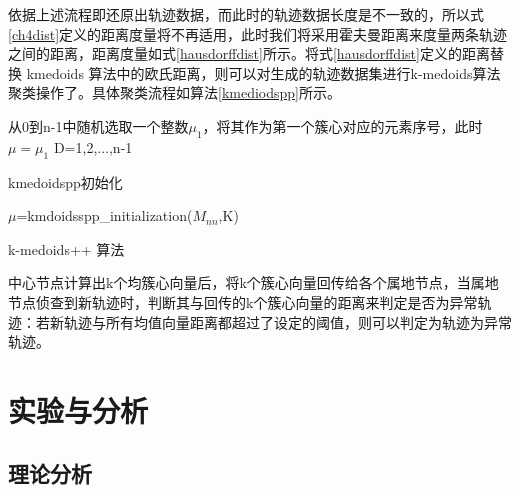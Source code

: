 依据上述流程即还原出轨迹数据，而此时的轨迹数据长度是不一致的，所以式\ref{ch4dist}定义的距离度量将不再适用，此时我们将采用霍夫曼距离来度量两条轨迹之间的距离，距离度量如式\ref{hausdorffdist}所示。将式\ref{hausdorffdist}定义的距离替换 kmedoids 算法中的欧氏距离，则可以对生成的轨迹数据集进行k-medoids算法聚类操作了。具体聚类流程如算法\ref{kmediodspp}所示。\\
\begin{algorithm}[H]
	 从0到n-1中随机选取一个整数$\mu_1$，将其作为第一个簇心对应的元素序号，此时$\mu={\mu_1}$\;
	 D={1,2,...,n-1}\;
	 \caption{kmedoidspp初始化}
\end{algorithm}
\begin{algorithm}[H]
	 $\mu$=kmdoidsspp\_initialization($M_{nn}$,K)\;
	 \caption{k-medoids++ 算法}
	 \label{kmediodspp}
\end{algorithm}

中心节点计算出k个均簇心向量后，将k个簇心向量回传给各个属地节点，当属地节点侦查到新轨迹时，判断其与回传的k个簇心向量的距离来判定是否为异常轨迹：若新轨迹与所有均值向量距离都超过了设定的阈值，则可以判定为轨迹为异常轨迹。


\section{实验与分析}

\subsection{理论分析}

